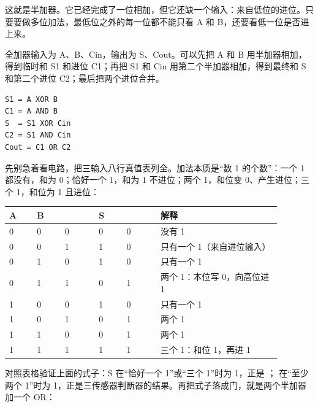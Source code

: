 这就是半加器。它已经完成了一位相加，但它还缺一个输入：来自低位的进位。只要要做多位加法，最低位之外的每一位都不能只看 A 和 B，还要看低一位是否进上来。

全加器输入为 A、B、Cin，输出为 S、Cout。可以先把 A 和 B 用半加器相加，得到临时和 S1 和进位 C1；再把 S1 和 Cin 用第二个半加器相加，得到最终和 S 和第二个进位 C2；最后把两个进位合并。

\begin{lstlisting}
S1 = A XOR B
C1 = A AND B
S  = S1 XOR Cin
C2 = S1 AND Cin
Cout = C1 OR C2
\end{lstlisting}

先别急着看电路，把三输入八行真值表列全。加法本质是“数 1 的个数”：一个 1 都没有，和为 0；恰好一个 1，和为 1 不进位；两个 1，和位变 0、产生进位；三个 1，和位为 1 且进位：

\begin{longtable}{L{0.09\linewidth}L{0.09\linewidth}L{0.11\linewidth}L{0.09\linewidth}L{0.11\linewidth}L{0.39\linewidth}}
\toprule
A & B &  & S &  & 解释 \\
 & 0 & 0 & 0 & 0 & 没有 1 \\
0 & 0 & 1 & 1 & 0 & 只有一个 1（来自进位输入） \\
0 & 1 & 0 & 1 & 0 & 只有一个 1 \\
0 & 1 & 1 & 0 & 1 & 两个 1：本位写 0，向高位进 1 \\
1 & 0 & 0 & 1 & 0 & 只有一个 1 \\
1 & 0 & 1 & 0 & 1 & 两个 1 \\
1 & 1 & 0 & 0 & 1 & 两个 1 \\
1 & 1 & 1 & 1 & 1 & 三个 1：和位 1，再进 1 \\
\bottomrule
\end{longtable}

对照表格验证上面的式子：S 在“恰好一个 1”或“三个 1”时为 1，正是 ； 在“至少两个 1”时为 1，正是三传感器判断器的结果。再把式子落成门，就是两个半加器加一个 OR：

